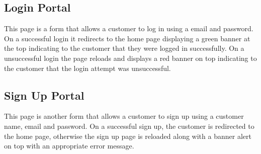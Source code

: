 \subsection{Login Portal}
This page is a form that allows a customer to log in using a email and password. On a successful login it redirects to the home page displaying a green banner at the top indicating to the customer that they were logged in successfully. On a unsuccessful login the page reloads and displays a red banner on top indicating to the customer that the login attempt was unsuccessful.
\subsection{Sign Up Portal}
This page is another form that allows a customer to sign up using a customer name, email and password. On a successful sign up, the customer is redirected to the home page, otherwise the sign up page is reloaded along with a banner alert on top with an appropriate error message.
